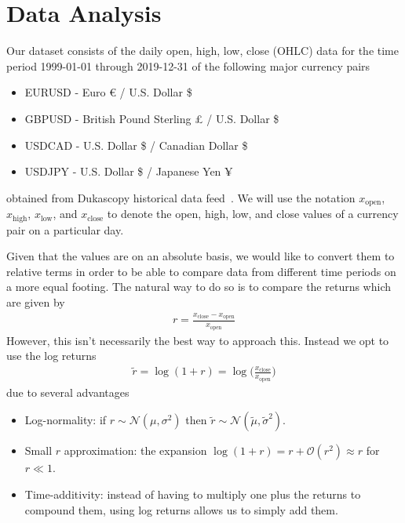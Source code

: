\section{Data Analysis}
Our dataset consists of the daily open, high, low, close (OHLC) data for the time period 1999-01-01 through 2019-12-31 of the following major currency pairs
\begin{itemize}
    \item EURUSD - Euro € / U.S. Dollar \$
    \item GBPUSD - British Pound Sterling £ / U.S. Dollar \$
    \item USDCAD - U.S. Dollar \$ / Canadian Dollar \$
    \item USDJPY - U.S. Dollar \$ / Japanese Yen ¥
\end{itemize}
obtained from Dukascopy historical data feed~\cite{dukascopy}.
We will use the notation \( x_\text{open} \), \( x_\text{high} \), \( x_\text{low} \), and \( x_\text{close} \) to denote the open, high, low, and close values of a currency pair on a particular day.

Given that the values are on an absolute basis, we would like to convert them to relative terms in order to be able to compare data from different time periods on a more equal footing.
The natural way to do so is to compare the returns which are given by
\begin{align}
    r = \frac{x_\text{close} - x_\text{open}}{x_\text{open}}
\end{align}
However, this isn't necessarily the best way to approach this.
Instead we opt to use the log returns
\begin{align}
    \tilde{r}
        = \log(1+r)
        = \log\bigg( \frac{x_\text{close}}{x_\text{open}} \bigg)
\end{align}
due to several advantages~\cite{quantivity_2012}
\begin{itemize}
    \item Log-normality: if \( r \sim \mathcal{N}(\mu, \sigma^2) \) then \( \tilde{r} \sim \mathcal{N}(\tilde{\mu}, \tilde{\sigma}^2) \).
    \item Small \( r \) approximation: the expansion \( \log (1 + r) = r + \mathcal{O}(r^2) \approx r \) for \( r \ll 1 \).
    \item Time-additivity: instead of having to multiply one plus the returns to compound them, using log returns allows us to simply add them.
\end{itemize}

